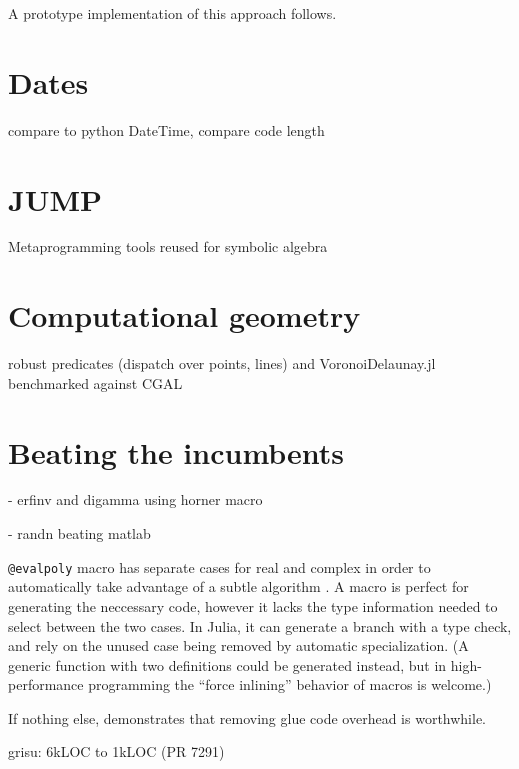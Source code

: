 A prototype implementation of this approach follows.



\section{Dates}
\label{sec:dates}

compare to python DateTime, compare code length


\section{JUMP}

Metaprogramming tools reused for symbolic algebra


\section{Computational geometry}

robust predicates (dispatch over points, lines) and VoronoiDelaunay.jl
benchmarked against CGAL


\section{Beating the incumbents}

- erfinv and digamma using horner macro

- randn beating matlab

\texttt{@evalpoly} macro has separate cases for real and complex in order to
automatically take advantage of a subtle algorithm \cite{knuth1969art}.
A macro is perfect for generating the neccessary code, however it lacks
the type information needed to select between the two cases.
In Julia, it can generate a branch with a type check, and rely on the
unused case being removed by automatic specialization. (A generic
function with two definitions could be generated instead, but in
high-performance programming the ``force inlining'' behavior of macros
is welcome.)

If nothing else, demonstrates that removing glue code overhead is worthwhile.

grisu: 6kLOC to 1kLOC (PR 7291)





